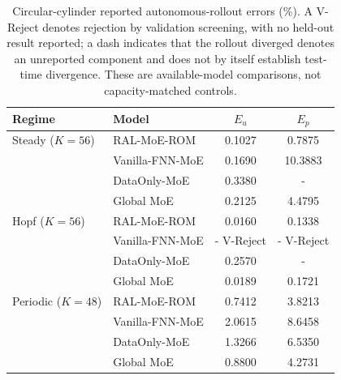 \documentclass{article}
\providecommand{\DIFaddtex}[1]{{\protect\color{blue} \sf #1}} %
\providecommand{\DIFdeltex}[1]{{\protect\color{red} \scriptsize #1}} %
\providecommand{\DIFaddFL}[1]{\DIFadd{#1}} %
\providecommand{\DIFdelFL}[1]{\DIFdel{#1}} %
\providecommand{\DIFaddbeginFL}{} %
\providecommand{\DIFaddendFL}{} %
\providecommand{\DIFdelbeginFL}{} %
\providecommand{\DIFdelendFL}{} %
\providecommand{\DIFadd}[1]{\texorpdfstring{\DIFaddtex{#1}}{#1}} %
\providecommand{\DIFdel}[1]{\texorpdfstring{\DIFdeltex{#1}}{}} %
\providecommand{\DIFscaledelfig}{0.5}
\newlength{\DIFdelgraphicswidth} %
\newlength{\DIFdelgraphicsheight} %
\providecommand{\DIFaddincludegraphics}[2][]{{\color{blue}\fbox{\DIFOincludegraphics[#1]{#2}}}} %
\providecommand{\DIFdelincludegraphics}[2][]{%
\sbox{\DIFdelgraphicsbox}{\DIFOincludegraphics[#1]{#2}}%
\settoboxwidth{\DIFdelgraphicswidth}{\DIFdelgraphicsbox} %
\settoboxtotalheight{\DIFdelgraphicsheight}{\DIFdelgraphicsbox} %
\scalebox{\DIFscaledelfig}{%
\parbox[b]{\DIFdelgraphicswidth}{\usebox{\DIFdelgraphicsbox}\\[-\baselineskip] \rule{\DIFdelgraphicswidth}{0em}}\llap{\resizebox{\DIFdelgraphicswidth}{\DIFdelgraphicsheight}{%
\setlength{\unitlength}{\DIFdelgraphicswidth}%
\begin{picture}(1,1)%
\thicklines\linethickness{2pt} %
{\color[rgb]{1,0,0}\put(0,0){\framebox(1,1){}}}%
{\color[rgb]{1,0,0}\put(0,0){\line( 1,1){1}}}%
{\color[rgb]{1,0,0}\put(0,1){\line(1,-1){1}}}%
\end{picture}%
}\hspace*{3pt}}} %
} %
\DeclareRobustCommand{\DIFaddbeginFL}{\DIFOaddbeginFL \let\includegraphics\DIFaddincludegraphics} %
\DeclareRobustCommand{\DIFaddendFL}{\DIFOaddendFL \let\includegraphics\DIFOincludegraphics} %
\DeclareRobustCommand{\DIFdelbeginFL}{\DIFOdelbeginFL \let\includegraphics\DIFdelincludegraphics} %
\DeclareRobustCommand{\DIFdelendFL}{\DIFOaddendFL \let\includegraphics\DIFOincludegraphics} %
\begin{document}
\begin{table}[H]
\centering
\caption{Circular-cylinder \DIFaddbeginFL \DIFaddFL{reported }\DIFaddendFL autonomous-rollout errors (\%). \DIFdelbeginFL \DIFdelFL{A }\DIFdelendFL \DIFaddbeginFL \DIFaddFL{V-Reject denotes rejection by validation screening, with no held-out result reported; a }\DIFaddendFL dash \DIFdelbeginFL \DIFdelFL{indicates that the rollout diverged}\DIFdelendFL \DIFaddbeginFL \DIFaddFL{denotes an unreported component and does not by itself establish test-time divergence}\DIFaddendFL . \DIFaddbeginFL \DIFaddFL{These are available-model comparisons, not capacity-matched controls.}\DIFaddendFL }
\label{tab:circular_full_reorg}
\small
\setlength{\tabcolsep}{4pt}
\begin{tabular}{llcc}
\toprule
Regime & Model & $E_u$ & $E_p$ \\
\midrule
Steady ($K=56$)
& RAL-MoE-ROM & 0.1027 & 0.7875 \\
& Vanilla-FNN-MoE & 0.1690 & 10.3883 \\
& DataOnly-MoE & 0.3380 & - \\
& Global MoE & 0.2125 & 4.4795 \\
\midrule
Hopf ($K=56$)
& RAL-MoE-ROM & 0.0160 & 0.1338 \\
& Vanilla-FNN-MoE & \DIFdelbeginFL \DIFdelFL{- }\DIFdelendFL \DIFaddbeginFL \DIFaddFL{V-Reject }\DIFaddendFL & \DIFdelbeginFL \DIFdelFL{- }\DIFdelendFL \DIFaddbeginFL \DIFaddFL{V-Reject }\DIFaddendFL \\
& DataOnly-MoE & 0.2570 & - \\
& Global MoE & 0.0189 & 0.1721 \\
\midrule
Periodic ($K=48$)
& RAL-MoE-ROM & 0.7412 & 3.8213 \\
& Vanilla-FNN-MoE & 2.0615 & 8.6458 \\
& DataOnly-MoE & 1.3266 & 6.5350 \\
& Global MoE & 0.8800 & 4.2731 \\
\bottomrule
\end{tabular}
\end{table}
\end{document}
